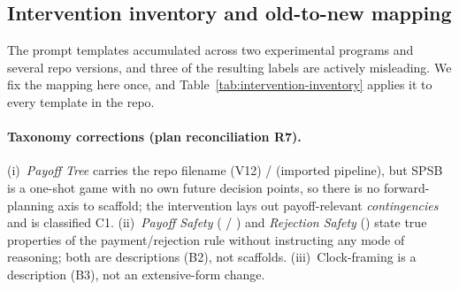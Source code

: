 \subsection{Intervention inventory and old-to-new mapping}\label{app:prompts-inventory}

The prompt templates accumulated across two experimental programs and several repo versions, and three of the resulting labels are actively misleading. We fix the mapping here once, and Table~\ref{tab:intervention-inventory} applies it to every template in the repo.

\paragraph{Taxonomy corrections (plan reconciliation R7).} (i)~\emph{Payoff Tree} carries the repo filename  (V12) /  (imported pipeline), but SPSB is a one-shot game with no own future decision points, so there is no forward-planning axis to scaffold; the intervention lays out payoff-relevant \emph{contingencies} and is classified C1. (ii)~\emph{Payoff Safety} ( / ) and \emph{Rejection Safety} () state true properties of the payment/rejection rule without instructing any mode of reasoning; both are descriptions (B2), not scaffolds. (iii)~Clock-framing is a description (B3), not an extensive-form change.


